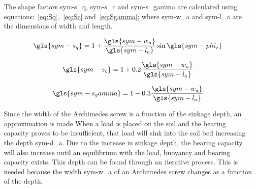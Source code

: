 \noindent The shape factors \gls{sym-s_q}, \gls{sym-s_c} and \gls{sym-s_gamma} are calculated using
equations:~\ref{eq:Sq},~\ref{eq:Sc} and~\ref{eq:Sgamma}; where \gls{sym-w_a} and \gls{sym-l_a} are the dimensions of
width and length.

\begin{equation}
    \label{eq:Sq}
    \gls{sym-s_q} = 1 + \frac{\gls{sym-w_a}}{\gls{sym-l_a}} \sin \gls{sym-phi_s}
\end{equation}

\begin{equation}
    \label{eq:Sc}
    \gls{sym-s_c} = 1 + 0.2 \frac{\gls{sym-w_a}}{\gls{sym-l_a}}
\end{equation}

\begin{equation}
    \label{eq:Sgamma}
    \gls{sym-s_gamma} = 1 - 0.3 \frac{\gls{sym-w_a}}{\gls{sym-l_a}}
\end{equation}

\noindent Since the width of the Archimedes screw is a function of the sinkage depth, an approximation is made When a
load is placed on the soil and the bearing capacity proves to be insufficient, that load will sink into the soil bed 
increasing the depth \gls{sym-d_a}. Due to the increase in sinkage depth, the bearing capacity will also increase 
until an equilibrium with the load, buoyancy and bearing capacity exists. This depth can be found through an 
iterative process. This is needed because the width \gls{sym-w_a} of an Archimedes screw changes as a function of the
depth.

